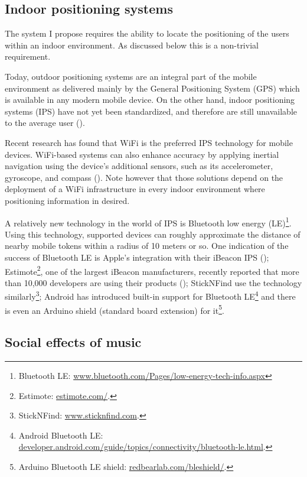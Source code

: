 \documentclass[a4paper,11pt]{article}
\begin{document}
\subsection{Indoor positioning systems} \label{literature:ips}

The system I propose requires the ability to locate the positioning of the users within an indoor environment.
As discussed below this is a non-trivial requirement.

Today, outdoor positioning systems are an integral part of the mobile environment as delivered mainly by the General Positioning System (GPS) which is available in any modern mobile device.
On the other hand, indoor positioning systems (IPS) have not yet been standardized, and therefore are still unavailable to the average user (\cite{web:turetsky}).

Recent research has found that WiFi is the preferred IPS technology for mobile devices.
WiFi-based systems can also enhance accuracy by applying inertial navigation using the device's additional sensors, such as its accelerometer, gyroscope, and compass (\cite{web:harrop}).
Note however that those solutions depend on the deployment of a WiFi infrastructure in every indoor environment where positioning information in desired.

A relatively new technology in the world of IPS is Bluetooth low energy (LE)\footnote{Bluetooth LE: \href{http://www.bluetooth.com/Pages/low-energy-tech-info.aspx}{www.bluetooth.com/Pages/low-energy-tech-info.aspx}}.
Using this technology, supported devices can roughly approximate the distance of nearby mobile tokens within a radius of 10 meters or so.
One indication of the success of Bluetooth LE is Apple's integration with their iBeacon IPS (\cite{web:danova});
Estimote\footnote{Estimote: \href{http://estimote.com/}{estimote.com/}.}, one of the largest iBeacon manufacturers, recently reported that more than 10,000 developers are using their products (\cite{web:thompson});
StickNFind use the technology similarly\footnote{StickNFind: \href{https://www.sticknfind.com}{www.sticknfind.com}.};
Android has introduced built-in support for Bluetooth LE\footnote{Android Bluetooth LE: \href{http://developer.android.com/guide/topics/connectivity/bluetooth-le.html}{developer.android.com/guide/topics/connectivity/bluetooth-le.html}.} and there is even an Arduino shield (standard board extension) for it\footnote{Arduino Bluetooth LE shield: \href{http://redbearlab.com/bleshield/}{redbearlab.com/bleshield/}.}.

\subsection{Social effects of music} \label{literature:social_effects}
\end{document}

